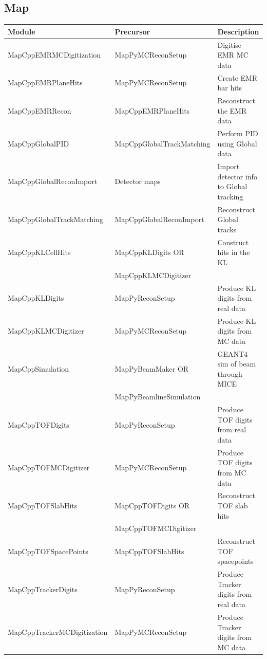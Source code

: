 \documentclass[a4paper,10pt]{article}
\begin{document}
  \subsection{Map}
    \begin{small}
    \noindent
      \renewcommand{\arraystretch}{1.5}
      \begin{tabular}{| l | l | l |}
        \hline
        \textbf{Module} & \textbf{Precursor} & \textbf{Description} \\
        \hline
        MapCppEMRMCDigitization & MapPyMCReconSetup & Digitise EMR MC data \\
        MapCppEMRPlaneHits & MapPyMCReconSetup & Create EMR bar hits \\
        MapCppEMRRecon & MapCppEMRPlaneHits & Reconstruct the EMR data \\
        MapCppGlobalPID & MapCppGlobalTrackMatching & Perform PID using Global data \\
        MapCppGlobalReconImport & Detector maps & Import detector info to Global tracking \\
        MapCppGlobalTrackMatching & MapCppGlobalReconImport & Reconstruct Global tracks \\
        MapCppKLCellHits & MapCppKLDigits OR & Construct hits in the KL \\
         & MapCppKLMCDigitizer & \\
        MapCppKLDigits & MapPyReconSetup & Produce KL digits from real data \\
        MapCppKLMCDigitizer & MapPyMCReconSetup & Produce KL digits from MC data \\
        MapCppSimulation & MapPyBeamMaker OR & GEANT4 sim of beam through MICE \\
         & MapPyBeamlineSimulation & \\
        MapCppTOFDigits & MapPyReconSetup & Produce TOF digits from real data \\
        MapCppTOFMCDigitizer & MapPyMCReconSetup & Produce TOF digits from MC data \\
        MapCppTOFSlabHits & MapCppTOFDigits OR & Reconstruct TOF slab hits \\
         & MapCppTOFMCDigitizer & \\
        MapCppTOFSpacePoints & MapCppTOFSlabHits & Reconstruct TOF spacepoints \\
        MapCppTrackerDigits & MapPyReconSetup & Produce Tracker digits from real data \\
        MapCppTrackerMCDigitization & MapPyMCReconSetup & Produce Tracker digits from MC data \\

\end{tabular}
\end{small}
\end{document}
